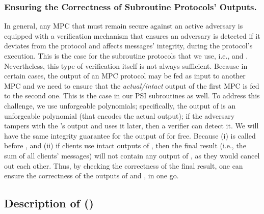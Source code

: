  \subsubsection{Ensuring the Correctness of Subroutine Protocols' Outputs.} 
 
 In general, any MPC that must remain secure against an active adversary  is equipped with a verification mechanism that ensures an adversary is detected if it deviates from the protocol and affects messages' integrity, during the protocol's execution. This is the case for the subroutine protocols that we use, i.e., \vopr and \zspaa. Nevertheless, this type of verification itself is not always sufficient. Because in certain cases, the output of an MPC protocol may be fed as input to another MPC and we need to ensure that the \emph{actual/intact} output of the first MPC is fed to the second one. This is the case in our PSI subroutines as well. To address this challenge, we use unforgeable polynomials; specifically, the output of \vopr is an unforgeable polynomial (that encodes the actual output); if the adversary tampers with the \vopr's output and uses it later, then a verifier can detect it. We will have the same integrity guarantee for the output of \zspaa for free. Because (i) \vopr is called before \zspaa, and (ii) if clients use intact outputs of \zspaa, then the final result (i.e., the sum of all clients' messages) will not contain any output of \zspaa, as they would cancel out each other. Thus, by checking the correctness of the final result, one can ensure the correctness of the outputs of \vopr and \zspaa, in one go. 
 
 
 


  
\subsection{Description of \withFai (\fpsi)}\label{Fair-PSI-Protocol}

